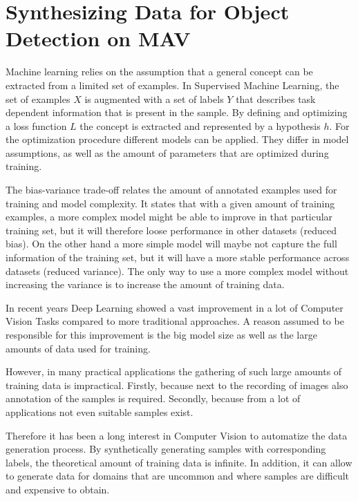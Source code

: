 \chapter{Synthesizing Data for Object Detection on \ac{MAV}}
\label{sec:training}

Machine learning relies on the assumption that a general concept can be extracted from a limited set of examples. 
In Supervised Machine Learning, the set of examples $X$ is augmented with a set of labels $Y$ that describes task dependent information that is present in the sample. By defining and optimizing a loss function $L$ the concept is extracted and represented by a hypothesis $h$. For the optimization procedure different models can be applied. They differ in model assumptions, as well as the amount of parameters that are optimized during training. 

The bias-variance trade-off relates the amount of annotated examples used for training and model complexity. It states that with a given amount of training examples, a more complex model might be able to improve in that particular training set, but it will therefore loose performance in other datasets (reduced bias). On the other hand a more simple model will maybe not capture the full information of the training set, but it will have a more stable performance across datasets (reduced variance). The only way to use a more complex model without increasing the variance is to increase the amount of training data.

In recent years Deep Learning showed a vast improvement in a lot of Computer Vision Tasks compared to more traditional approaches. A reason assumed to be responsible for this improvement is the big model size as well as the large amounts of data used for training. 

However, in many practical applications the gathering of such large amounts of training data is impractical. Firstly, because next to the recording of images also annotation of the samples is required. Secondly, because from a lot of applications not even suitable samples exist.

Therefore it has been a long interest in Computer Vision to automatize the data generation process. By synthetically generating samples with corresponding labels, the theoretical amount of training data is infinite. In addition, it can allow to generate data for domains that are uncommon and where samples are difficult and expensive to obtain.

